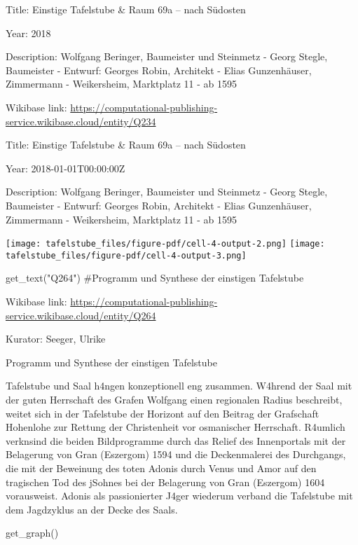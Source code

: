 \documentclass[
  letterpaper,
]{book}
\newenvironment{Shaded}{\begin{snugshade}}{\end{snugshade}}
\newcommand{\CommentTok}[1]{\textcolor[rgb]{0.37,0.37,0.37}{#1}}
\newcommand{\NormalTok}[1]{\textcolor[rgb]{0.00,0.23,0.31}{#1}}
\newcommand{\StringTok}[1]{\textcolor[rgb]{0.13,0.47,0.30}{#1}}
\begin{document}
Title: Einstige Tafelstube \& Raum 69a -- nach Südosten

Year: 2018

Description: Wolfgang Beringer, Baumeister und Steinmetz - Georg Stegle,
Baumeister - Entwurf: Georges Robin, Architekt - Elias Gunzenhäuser,
Zimmermann - Weikersheim, Marktplatz 11 - ab 1595

Wikibase link:
\url{https://computational-publishing-service.wikibase.cloud/entity/Q234}

Title: Einstige Tafelstube \& Raum 69a -- nach Südosten

Year: 2018-01-01T00:00:00Z

Description: Wolfgang Beringer, Baumeister und Steinmetz - Georg Stegle,
Baumeister - Entwurf: Georges Robin, Architekt - Elias Gunzenhäuser,
Zimmermann - Weikersheim, Marktplatz 11 - ab 1595

\texttt{[image: tafelstube\_files/figure-pdf/cell-4-output-2.png]}
\texttt{[image: tafelstube\_files/figure-pdf/cell-4-output-3.png]}

\begin{Shaded}
\begin{Highlighting}[]
\NormalTok{get\_text(}\StringTok{"Q264"}\NormalTok{)}
\CommentTok{\#Programm und Synthese der einstigen Tafelstube}
\end{Highlighting}
\end{Shaded}

Wikibase link:
\url{https://computational-publishing-service.wikibase.cloud/entity/Q264}

Kurator: Seeger, Ulrike

Programm und Synthese der einstigen Tafelstube

Tafelstube und Saal h\xa4ngen konzeptionell eng zusammen.
W\xa4hrend der Saal mit der guten Herrschaft des Grafen Wolfgang
einen regionalen Radius beschreibt, weitet sich in der Tafelstube der
Horizont auf den Beitrag der Grafschaft Hohenlohe zur Rettung der
Christenheit vor osmanischer Herrschaft. R\xa4umlich
verkn\xbcpft sind die beiden Bildprogramme durch das Relief des
Innenportals mit der Belagerung von Gran (Eszergom) 1594 und die
Deckenmalerei des Durchgangs, die mit der Beweinung des toten Adonis
durch Venus und Amor auf den tragischen Tod des j\xbcngsten Sohnes
bei der Belagerung von Gran (Eszergom) 1604 vorausweist. Adonis als
passionierter J\xa4ger wiederum verband die Tafelstube mit dem
Jagdzyklus an der Decke des Saals.

\begin{Shaded}
\begin{Highlighting}[]
\NormalTok{get\_graph()}
\end{Highlighting}
\end{Shaded}
\end{document}
